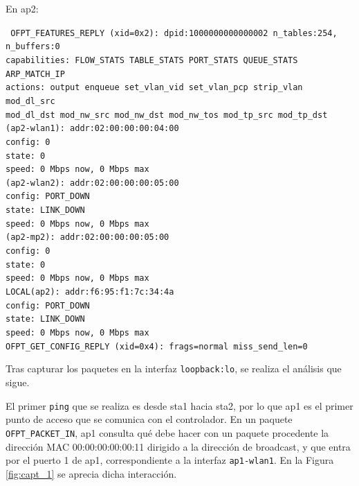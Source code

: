\documentclass[a4paper,12pt,twoside,spanish]{book}
\begin{document}
En ap2:\par

\noindent\texttt{
\indent OFPT\_FEATURES\_REPLY (xid=0x2): dpid:1000000000000002 n\_tables:254, \\
\indent \indent n\_buffers:0\\
\indent capabilities: FLOW\_STATS TABLE\_STATS PORT\_STATS QUEUE\_STATS \\ 
\indent \indent ARP\_MATCH\_IP \\
\indent actions: output enqueue set\_vlan\_vid set\_vlan\_pcp strip\_vlan mod\_dl\_src \\ 
\indent \indent mod\_dl\_dst mod\_nw\_src mod\_nw\_dst mod\_nw\_tos mod\_tp\_src mod\_tp\_dst\\
(ap2-wlan1): addr:02:00:00:00:04:00\\
\indent \indent config:     0\\
\indent \indent state:      0\\
\indent \indent speed: 0 Mbps now, 0 Mbps max\\
(ap2-wlan2): addr:02:00:00:00:05:00\\
\indent \indent config:     PORT\_DOWN\\
\indent \indent state:      LINK\_DOWN\\
\indent \indent speed: 0 Mbps now, 0 Mbps max\\
(ap2-mp2): addr:02:00:00:00:05:00\\
\indent \indent config:     0\\
\indent \indent state:      0\\
\indent \indent speed: 0 Mbps now, 0 Mbps max\\
\indent LOCAL(ap2): addr:f6:95:f1:7c:34:4a\\
\indent \indent config:     PORT\_DOWN\\
\indent \indent state:      LINK\_DOWN\\
\indent \indent speed: 0 Mbps now, 0 Mbps max\\
\indent OFPT\_GET\_CONFIG\_REPLY (xid=0x4): frags=normal miss\_send\_len=0
}\par 

Tras capturar los paquetes en la interfaz \texttt{loopback:lo}, se realiza el análisis que sigue.\par 

El primer \texttt{ping} que se realiza es desde sta1 hacia sta2, por lo que ap1 es el primer punto de acceso que se comunica con el controlador. En un paquete \texttt{OFPT\_PACKET\_IN}, ap1 consulta qué debe hacer con un paquete procedente la dirección MAC 00:00:00:00:00:11 dirigido a la dirección de broadcast, y que entra por el puerto 1 de ap1, correspondiente a la interfaz \texttt{ap1-wlan1}. En la Figura \ref{fig:capt_1} se aprecia dicha interacción.\par 
\end{document}
